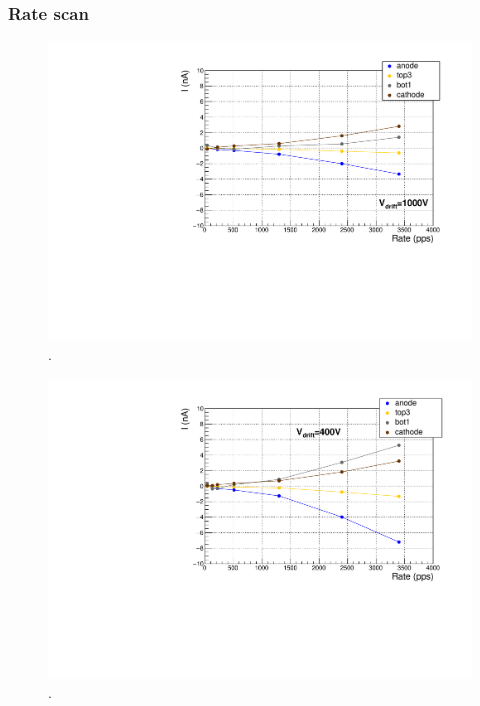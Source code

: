 \documentclass[a4paper, 11 pt]{report}
\begin{document}
\clearpage
  \subsubsection{Rate scan}  

  \begin{figure}[htbp]
	\centering
	\includegraphics[width=\textwidth]{Immagini/rateScan_ROW_THGEM_Vdrift1000_2020-03-10.pdf}
	\caption{.}
	\label{fig:Rate_ROW_beam_H}
  \end{figure}
  
  \begin{figure}[htbp]
	\centering
	\includegraphics[width=\textwidth]{Immagini/rateScan_ROW_THGEM_Vdrift400_2020-03-10.pdf}
	\caption{.}
	\label{fig:Rate_ROW_beam_L}
  \end{figure}
  
\end{document}

